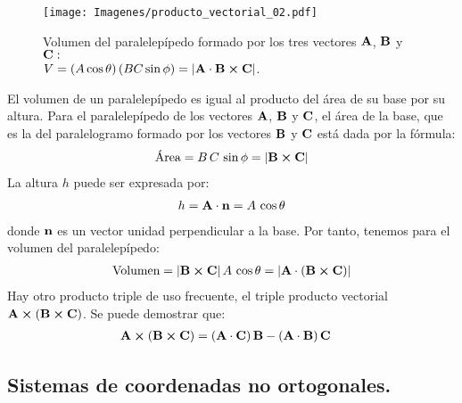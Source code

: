 \documentclass[12pt]{article}
\begin{document}
\begin{figure}[H]
    \centering
    \texttt{[image: Imagenes/producto\_vectorial\_02.pdf]}
    \caption{Volumen del paralelepípedo formado por los tres vectores $\vb{A}$, $\vb{B}$ y $\vb{C}:$ \\ \centering $ V = \left( A \cos \theta \right) \left( B C \sin \phi \right) = \abs{\vb{A} \cdot \vb{B} \cp \vb{C}}$.}
    \label{fig:figura_01_11}
\end{figure}
El volumen de un paralelepípedo es igual al producto del área de su base por su altura. Para el paralelepípedo de los vectores $\vb{A}$, $\vb{B}$ y $\vb{C}$, el área de la base, que es la del paralelogramo formado por los vectores $\vb{B}$ y $\vb{C}$ está dada por la fórmula: 
\begin{align}
\text{Área} = B \, C \, \sin \phi = \abs{\vb{B} \cp \vb{C}}
\label{eq:ecuacion_01_29} 
\end{align}
La altura $h$ puede ser expresada por:
\begin{align*}
h =\vb{A} \cdot \vb{n} = A \, \cos \theta
\end{align*}
donde $\vb{n}$ es un vector unidad perpendicular a la base. Por tanto, tenemos para el volumen del paralelepípedo: 
\begin{align}
\text{Volumen} =  \abs{\vb{B} \cp \vb{C}} \, A \, \cos \theta = \abs{\vb{A} \cdot \left( \vb{B} \cp \vb{C} \right)} 
\label{eq:ecuacion_01_30}
\end{align}
Hay otro producto triple de uso frecuente, el triple producto vectorial $\vb{A} \cp \left( \vb{B} \cp \vb{C} \right)$. Se puede demostrar que:
\begin{align}
\vb{A} \cp \left( \vb{B} \cp \vb{C} \right) &= \left( \vb{A} \cdot \vb{C} \right) \vb{B} - \left( \vb{A} \cdot \vb{B} \right) \vb{C} 
\label{eq:ecuacion_01_31}
\end{align}

\subsection{Sistemas de coordenadas no ortogonales.}
\end{document}
